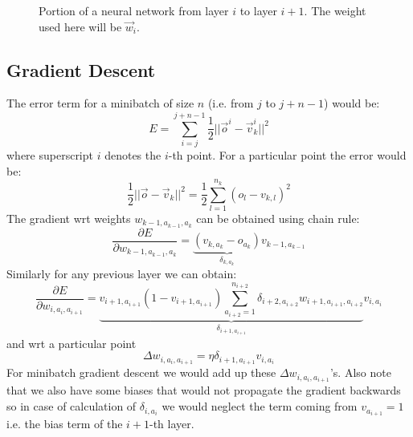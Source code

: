 \documentclass{article}
\begin{document}
\begin{figure}[H]
\centering
{}
\caption{Portion of a neural network from layer $i$ to layer $i+1$. The weight used here will be $\vec w_i$.}
\end{figure}
\subsection{Gradient Descent}
The error term for a minibatch of size $n$ (i.e. from $j$ to $j+n-1$) would be:
$$E = \sum_{i=j}^{j+n-1}\frac 12 || \vec o^i- \vec v_{k}^i||^2$$
where superscript $i$ denotes the $i$-th point.
For a particular point the error would be:
$$\frac 12 || \vec o- \vec v_{k}||^2=\frac 12\sum_{l=1}^{n_k}(o_{l}-v_{k,l})^2$$
The gradient wrt weights $w_{k-1,a_{k-1},a_{k}}$ can be obtained using chain rule:\\
$$\frac{\partial E}{\partial w_{k-1,a_{k-1},a_{k}}}=\underbrace{(v_{k,a_k}-o_{a_k})}_{\delta_{k,a_k}}v_{k-1,a_{k-1}}$$
Similarly for any previous layer we can obtain:\\
$$\frac{\partial E}{\partial w_{i,a_i,a_{i+1}}}=\underbrace{v_{i+1,a_{i+1}}(1-v_{i+1,a_{i+1}})\sum_{a_{i+2}=1}^{n_{i+2}} \delta_{i+2,a_{i+2}}w_{i+1,a_{i+1},a_{i+2}}}_{\delta_{i+1,a_{i+1}}}v_{i,a_i}$$
and wrt a particular point\\
$$\Delta w_{i,a_i,a_{i+1}}=\eta \delta_{i+1,a_{i+1}}v_{i,a_i}$$
For minibatch gradient descent we would add up these $\Delta w_{i,a_i,a_{i+1}}$'s. Also note that we also have some biases that would not propagate the gradient backwards so in case of calculation of $\delta_{i,a_i}$ we would neglect the term coming from $v_{a_{i+1}}=1$ i.e. the bias term of the $i+1$-th layer.
\end{document}
